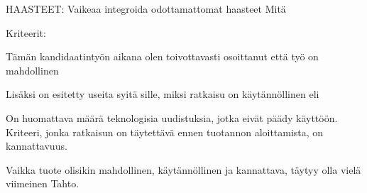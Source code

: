 \documentclass[finnish,12pt]{article}
\begin{document}
HAASTEET:
Vaikeaa integroida
odottamattomat haasteet
Mitä

Kriteerit:

Tämän kandidaatintyön aikana olen toivottavasti osoittanut että työ on mahdollinen

Lisäksi on esitetty useita syitä sille, miksi ratkaisu on käytännöllinen eli 

On huomattava määrä teknologisia uudistuksia, jotka eivät päädy käyttöön.
Kriteeri, jonka ratkaisun on täytettävä ennen tuotannon aloittamista, on kannattavuus.

Vaikka tuote olisikin mahdollinen, käytännöllinen ja kannattava, täytyy olla vielä viimeinen
Tahto.

\clearpage
{}


\end{document}
